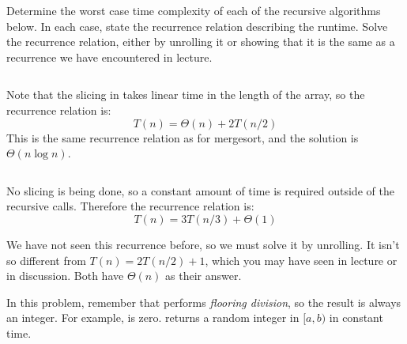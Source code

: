 \begin{prob}
    Determine the worst case time complexity of each of the recursive algorithms below.
    In each case, state the recurrence relation describing the runtime. Solve the recurrence
    relation, either by unrolling it or showing that it is the same as a recurrence we have
    encountered in lecture.

    \begin{subprobset}
        \begin{subprob}
            \inputminted{python}{\thisdir/include/part_a.py}

            \begin{soln}
                Note that the slicing in  takes linear time
                in the length of the array, so the recurrence relation is:
                \[
                    T(n) = \Theta(n) + 2T(n/2)
                \]
                This is the same recurrence relation as for mergesort, and the solution
                is $\Theta(n \log n)$.
            \end{soln}
        \end{subprob}


        \begin{subprob}

            \inputminted{python}{\thisdir/include/part_b.py}

            \begin{soln}
                No slicing is being done, so a constant amount of time is required outside
                of the recursive calls. Therefore the recurrence relation is:
                \[
                    T(n) = 3T(n/3) + \Theta(1)
                \]

                We have not seen this recurrence before, so we must solve it by unrolling.
                It isn't so different from $T(n) = 2 T(n/2) + 1$, which you may have seen
                in lecture or in discussion. Both have $\Theta(n)$ as their answer.
            \end{soln}
        \end{subprob}

        \begin{subprob}
            In this problem, remember that \python{//} performs \emph{flooring division},
            so the result is always an integer. For example,  is zero.
             returns a random integer in $[a,b)$ in constant time.


\end{subprob}
\end{subprobset}
\end{prob}
